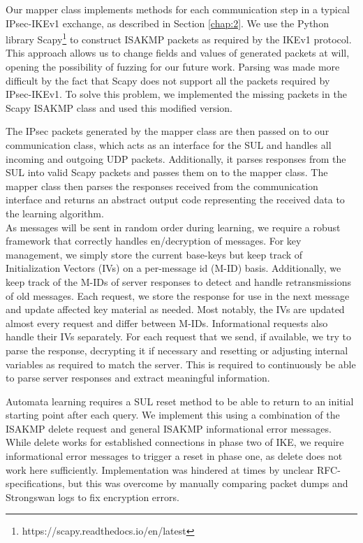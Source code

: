 \documentclass[runningheads]{llncs}
\begin{document}
Our mapper class implements methods for each communication step in a typical IPsec-IKEv1 exchange, as described in Section \ref{chap:2}. We use the Python library Scapy\footnote{https://scapy.readthedocs.io/en/latest} to construct ISAKMP packets as required by the IKEv1 protocol. This approach allows us to change fields and values of generated packets at will, opening the possibility of fuzzing for our future work. Parsing was made more difficult by the fact that Scapy does not support all the packets required by IPsec-IKEv1. To solve this problem, we implemented the missing packets in the Scapy ISAKMP class and used this modified version. 

The IPsec packets generated by the mapper class are then passed on to our communication class, which acts as an interface for the SUL and handles all incoming and outgoing UDP packets. Additionally, it parses responses from the SUL into valid Scapy packets and passes them on to the mapper class. The mapper class then parses the responses received from the communication interface and returns an abstract output code representing the received data to the learning algorithm. \\

As messages will be sent in random order during learning, we require a robust framework that correctly handles en/decryption of messages. For key management, we simply store the current base-keys but keep track of Initialization Vectors (IVs) on a per-message id (M-ID) basis. Additionally, we keep track of the M-IDs of server responses to detect and handle retransmissions of old messages. Each request, we store the response for use in the next message and update affected key material as needed. Most notably, the IVs are updated almost every request and differ between M-IDs. Informational requests also handle their IVs separately. For each request that we send, if available, we try to parse the response, decrypting it if necessary and resetting or adjusting internal variables as required to match the server. This is required to continuously be able to parse server responses and extract meaningful information.

Automata learning requires a SUL reset method to be able to return to an initial starting point after each query. We implement this using a combination of the ISAKMP delete request and general ISAKMP informational error messages. While delete works for established connections in phase two of IKE, we require informational error messages to trigger a reset in phase one, as delete does not work here sufficiently. Implementation was hindered at times by unclear RFC-specifications, but this was overcome by manually comparing packet dumps and Strongswan logs to fix encryption errors.\\
\end{document}
